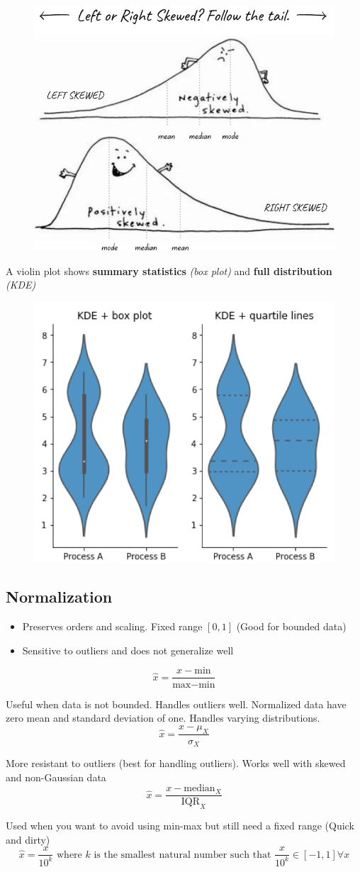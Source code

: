 \documentclass{article}
\begin{document}
\begin{figure}[H]
    \includegraphics[width=0.3\linewidth]{images/skew.png}
\end{figure}
A violin plot shows \textbf{summary statistics} \textit{(box plot)} and \textbf{full distribution} \textit{(KDE)}
\begin{figure}[H]
    \includegraphics[width=0.3\linewidth]{images/violin.png}
\end{figure}

\subsection*{Normalization}
\begin{itemize}
    \item Preserves orders and scaling. Fixed range $[0,1]$ (Good for bounded data)
    \item Sensitive to outliers and does not generalize well
\end{itemize}
\[
\hat{x} = \frac{x-\text{min}}{\text{max} - \text{min}}
\]

Useful when data is not bounded. Handles outliers well. Normalized data have zero mean and standard deviation of one. Handles varying distributions.
\[
\hat{x} = \frac{x - \mu_X}{\sigma_X}
\]

More resistant to outliers (best for handling outliers). Works well with skewed and non-Gaussian data
\[
\hat{x} = \frac{x - \text{median}_X}{\text{IQR}_X}
\]

Used when you want to avoid using min-max but still need a fixed range (Quick and dirty)
\[
\hat{x} = \frac{x}{10^k} \text{ where } k \text{ is the smallest natural number such that }\frac{x}{10^k} \in [-1,1] \forall x
\]
\end{document}
